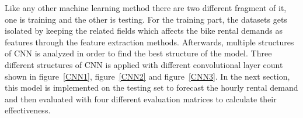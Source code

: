 Like any other machine learning method there are two different fragment of it, one is training and the other is testing. For the training part, the datasets gets isolated by keeping the related fields which affects the bike rental demands as features through the feature extraction methods. Afterwards, multiple structures of CNN is analyzed in order to find the best structure of the model. Three different structures of CNN is applied with different convolutional layer count shown in figure~\ref{CNN1}, figure~\ref{CNN2} and figure~\ref{CNN3}. In the next section, this model is implemented on the testing set to forecast the hourly rental demand and then evaluated with four different evaluation matrices to calculate their effectiveness. 



\begin{figure}
\centering
{}
\end{figure}

